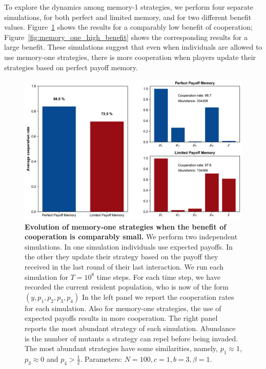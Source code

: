 \documentclass[11pt]{article}
\theoremstyle{plainCl1}
\theoremstyle{plainCl2}
\begin{document}
To explore the dynamics among memory-1 strategies, we perform four separate simulations, for both perfect and limited memory, and for two different benefit values. 
Figure~\ref{fig:memory_one_low_benefit} shows the results for a comparably low benefit of cooperation; 
Figure~\ref{fig:memory_one_high_benefit} shows the corresponding results for a large benefit. 
These simulations suggest that even when individuals
are allowed to use memory-one strategies, there is more cooperation when players update their strategies based on perfect payoff memory. 

\begin{figure}[!htbp]
  \centering 
  \includegraphics[width=\textwidth]{static/memory_one_results_low_benefit.pdf}
  \caption{\textbf{Evolution of memory-one strategies when the benefit of cooperation is comparably small.}
  We perform two independent simulations. In one simulation individuals use
  expected payoffs. 
  In the other they update their strategy based on the payoff they received in the last round of their last interaction. 
  We run each simulation for \(T = 10^8\) time steps.
  For each time step, we have recorded the current resident population, who is
  now of the form  \((y, p_1, p_2, p_3, p_4)\) In the left panel we report the
  cooperation rates for each simulation. 
  Also for memory-one strategies, the use of expected payoffs results in more cooperation. 
  The right panel reports the most abundant strategy of each
  simulation. Abundance is the number of mutants a strategy can repel before
  being invaded. The most abundant strategies have some similarities,
  namely, \(p_1 \approx 1\), \(p_3 \approx 0\) and \(p_4 > \frac{1}{2}\). 
  Parameters: \(N =100, c=1, b=3, \beta=1\).}\label{fig:memory_one_low_benefit}
\end{figure}
\end{document}
